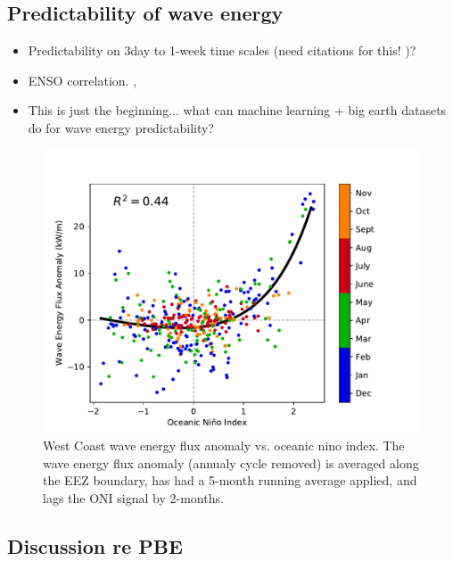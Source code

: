 \subsection{Predictability of wave energy}

\begin{itemize}
\item Predictability on 3day to 1-week time scales (need citations for this! )?
\item ENSO correlation. \citep{Yang_etal_2020}, 
\item This is just the beginning... what can machine learning + big earth datasets do for wave energy predictability?
\end{itemize}


\begin{figure}[ht]
  \centering
  \includegraphics[width=\textwidth]{../fig/ENSO-Comparison.wc.pdf}
  \caption{West Coast wave energy flux anomaly vs. oceanic nino index. The wave energy flux anomaly (annualy cycle removed) is averaged along the EEZ boundary, has had a 5-month running average applied, and lags the ONI signal by 2-months.}
  \label{fig:wc-nino}
\end{figure}


\subsection{Discussion re PBE}

